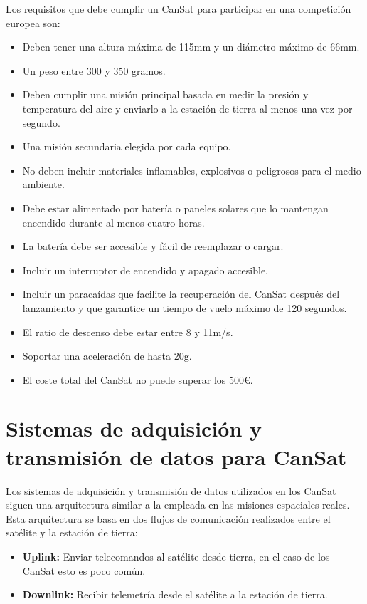 Los requisitos que debe cumplir un CanSat para participar en una competición europea son:
\begin{itemize}
    \item Deben tener una altura máxima de 115mm y un diámetro máximo de 66mm.
    \item Un peso entre 300 y 350 gramos.
    \item Deben cumplir una misión principal basada en medir la presión y temperatura del aire y enviarlo a la estación de tierra al menos una vez por segundo.
    \item Una misión secundaria elegida por cada equipo.
    \item No deben incluir materiales inflamables, explosivos o peligrosos para el medio ambiente.
    \item Debe estar alimentado por batería o paneles solares que lo mantengan encendido durante al menos cuatro horas.
    \item La batería debe ser accesible y fácil de reemplazar o cargar.
    \item Incluir un interruptor de encendido y apagado accesible.
    \item Incluir un paracaídas que facilite la recuperación del CanSat después del lanzamiento y que garantice un tiempo de vuelo máximo de 120 segundos.
    \item El ratio de descenso debe estar entre 8 y 11m/s.
    \item Soportar una aceleración de hasta 20g.
    \item El coste total del CanSat no puede superar los 500€.
\end{itemize}


\section{Sistemas de adquisición y transmisión de datos para CanSat}
Los sistemas de adquisición y transmisión de datos utilizados en los CanSat siguen una arquitectura similar a la empleada en las misiones espaciales reales.
Esta arquitectura se basa en dos flujos de comunicación realizados entre el satélite y la estación de tierra:
\begin{itemize}
    \item \textbf{Uplink:} Enviar telecomandos al satélite desde tierra, en el caso de los CanSat esto es poco común.
    \item \textbf{Downlink:} Recibir telemetría desde el satélite a la estación de tierra.
\end{itemize}

